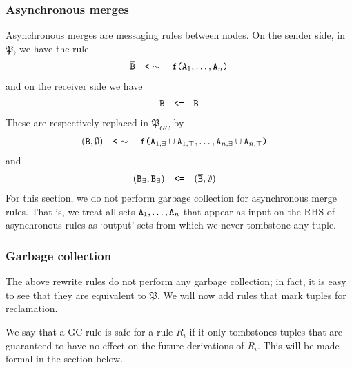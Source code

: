 \documentclass{article}
\numberwithin{equation}{section}
\renewcommand{\tt}[1]{\ifmmode\text{\texttt{#1}}\else\texttt{#1}\fi}
\begin{document}
\subsubsection{Asynchronous merges}
Asynchronous merges are messaging rules between nodes.
On the sender side, in $\mathfrak{P}$, we have the rule 
\begin{align}
\overline{\tt{B}} \quad\tt{<}\sim\quad \tt{f(}\tt{A}_1,\dots,\tt{A}_n\tt{)}
\end{align}
and on the receiver side we have
\begin{align}
\tt{B} \quad\tt{<=}\quad \overline{\tt{B}}
\end{align}
These are respectively replaced in $\mathfrak{P}_{GC}$ by
\begin{align}
(\overline{\tt{B}}, \emptyset) &\quad\tt{<}\sim\quad \tt{f(}\tt{A}_{1,\exists} \cup \tt{A}_{1,\top},\dots,\tt{A}_{n,\exists} \cup \tt{A}_{n,\top}\tt{)}
\end{align}
and
\begin{align}
(\tt{B}_\exists, \tt{B}_\exists) &\quad\tt{<=}\quad (\overline{\tt{B}}, \emptyset)
\end{align}
For this section, we do not perform garbage collection for asynchronous merge rules.
That is, we treat all sets $\tt{A}_1, \dots, \tt{A}_n$ that appear as input on the RHS of asynchronous rules as `output' sets from which we never tombstone any tuple.

\subsubsection{Garbage collection}
The above rewrite rules do not perform any garbage collection; in fact, it is easy to see that they are equivalent to $\mathfrak{P}$.
We will now add rules that mark tuples for reclamation.

We say that a GC rule is safe for a rule $R_i$ if it only tombstones tuples that are guaranteed to have no effect on the future derivations of $R_i$.
This will be made formal in the section below.
\end{document}

